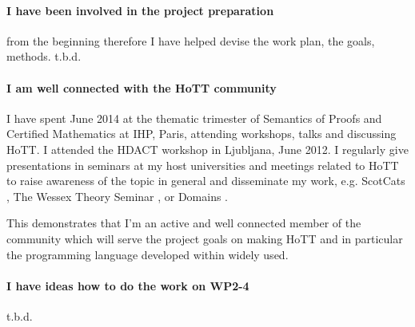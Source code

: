 \documentclass[a4paper]{article}
\begin{document}
\paragraph{I have been involved in the project preparation} from the
beginning therefore I have helped devise the work plan, the
goals, methods.
t.b.d.



\paragraph{I am well connected with the HoTT community}
I have spent June 2014 at the thematic trimester of Semantics of
Proofs and Certified Mathematics at IHP, Paris, attending workshops,
talks and discussing HoTT.
%
I attended the HDACT workshop in Ljubljana, June 2012. 
%
I regularly give presentations in seminars at my host universities and
meetings related to HoTT to raise awareness of the topic in general
and disseminate my work, e.g. ScotCats , The
Wessex Theory Seminar , or Domains .

This demonstrates that I'm an active and well connected member of
the community which will serve the project goals on making HoTT and in
particular the programming language developed within widely used.

\paragraph{I have ideas how to do the work on WP2-4}
t.b.d.


\end{document}
